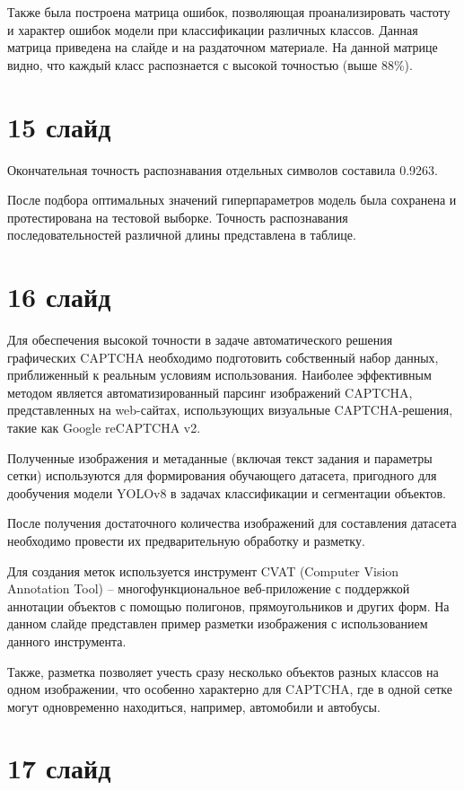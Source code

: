 \documentclass{altsu-report}
\begin{document}
Также была построена матрица ошибок, позволяющая проанализировать частоту и 
характер ошибок модели при классификации различных классов. Данная матрица 
приведена на слайде и на раздаточном материале. На данной матрице видно, что 
каждый класс распознается с высокой точностью (выше 88\%).

\section*{15 слайд}

Окончательная точность распознавания отдельных символов составила 0.9263.

После подбора оптимальных значений гиперпараметров модель была сохранена и 
протестирована на тестовой выборке. Точность распознавания последовательностей 
различной длины представлена в таблице.

\section*{16 слайд}

Для обеспечения высокой точности в задаче автоматического решения графических 
CAPTCHA необходимо подготовить собственный набор данных, приближенный к реальным 
условиям использования. Наиболее эффективным методом является автоматизированный 
парсинг изображений CAPTCHA, представленных на web-сайтах, использующих 
визуальные CAPTCHA-решения, такие как Google reCAPTCHA v2.

Полученные изображения и метаданные (включая текст задания и параметры сетки) 
используются для формирования обучающего датасета, пригодного для дообучения 
модели YOLOv8 в задачах классификации и сегментации объектов.

После получения достаточного количества изображений для составления датасета 
необходимо провести их предварительную обработку и разметку.

Для создания меток используется инструмент CVAT (Computer Vision Annotation Tool) 
-- многофункциональное веб-приложение с поддержкой аннотации объектов с помощью 
полигонов, прямоугольников и других форм. На данном слайде представлен пример 
разметки изображения с использованием данного инструмента.

Также, разметка позволяет учесть сразу несколько объектов разных классов на 
одном изображении, что особенно характерно для CAPTCHA, где в одной сетке могут 
одновременно находиться, например, автомобили и автобусы.

\section*{17 слайд}
\end{document}
